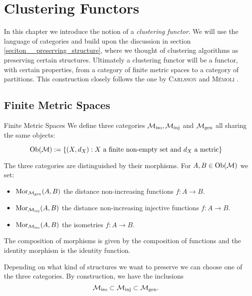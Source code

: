 \chapter{Clustering Functors}
\label{chapter__clustering_functor}

In this chapter we introduce the notion of a \emph{clustering functor}.
We will use the language of categories and build upon the discussion in section \ref{seciton__preserving_structure}, where we thought of clustering algorithms as preserving certain structures.
Ultimately a clustering functor will be a functor, with certain properties, from a category of finite metric spaces to a category of partitions.
This construction closely follows the one by \textsc{Carlsson} and \textsc{M\'emoli} \cite{Carlsson2010}.

\section{Finite Metric Spaces}
\label{section__finite_metric_spaces}

\begin{definition}{Finite Metric Spaces \cite[Sec.~3.2]{Carlsson2010}}{}
We define three categories ${\mathcal{M}_\mathrm{iso}}, {\mathcal{M}_\mathrm{inj}}$ and ${\mathcal{M}_\mathrm{gen}}$ all sharing the same objects:

\begin{equation*}
\mathrm {Ob}(\mathcal{M}) := \{(X,d_X): \text{$X$ a finite non-empty set and $d_X$ a metric}\}
\end{equation*}

The three categories are distinguished by their morphisms. For $A, B \in \mathrm {Ob}(\mathcal{M})$ we set:
\begin{itemize}
    \item $\mathrm {Mor}_{\mathcal{M}_\mathrm{gen}}(A,B)$ the distance non-increasing functions $f: A \to B$.
    \item $\mathrm {Mor}_{\mathcal{M}_\mathrm{inj}}(A,B)$ the distance non-increasing injective functions $f: A \to B$.
    \item $\mathrm {Mor}_{\mathcal{M}_\mathrm{iso}}(A,B)$ the isometries $f: A \to B$.
\end{itemize}
The composition of morphisms is given by the composition of functions and the identity morphism is the identity function.
\end{definition}

Depending on what kind of structures we want to preserve we can choose one of the three categories.
By construction, we have the inclusions
\begin{equation}
    \label{eq:inclusions_of_finite_metric_space_categories}
    {\mathcal{M}_\mathrm{iso}} \subset {\mathcal{M}_\mathrm{inj}} \subset {\mathcal{M}_\mathrm{gen}}.
\end{equation}

